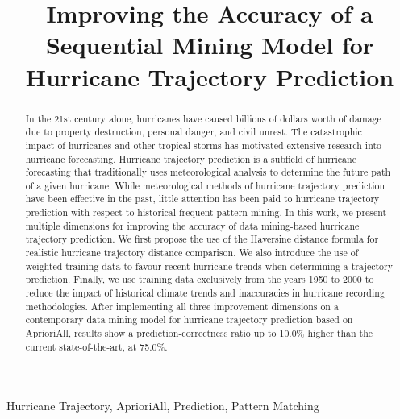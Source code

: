 \documentclass[12pt,conference]{IEEEtran}
\begin{document}
\raggedbottom

\title{Improving the Accuracy of a Sequential Mining Model for Hurricane Trajectory Prediction}

\author{
}

\maketitle

\begin{abstract}

In the 21st century alone, hurricanes have caused billions of dollars worth of damage due to property destruction, personal danger, and civil unrest. The catastrophic impact of hurricanes and other tropical storms has motivated extensive research into hurricane forecasting. Hurricane trajectory prediction is a subfield of hurricane forecasting that traditionally uses meteorological analysis to determine the future path of a given hurricane. While meteorological methods of hurricane trajectory prediction have been effective in the past, little attention has been paid to hurricane trajectory prediction with respect to historical frequent pattern mining. In this work, we present multiple dimensions for improving the accuracy of data mining-based hurricane trajectory prediction. We first propose the use of the Haversine distance formula for realistic hurricane trajectory distance comparison. We also introduce the use of weighted training data to favour recent hurricane trends when determining a trajectory prediction. Finally, we use training data exclusively from the years 1950 to 2000 to reduce the impact of historical climate trends and inaccuracies in hurricane recording methodologies. After implementing all three improvement dimensions on a contemporary data mining model for hurricane trajectory prediction based on AprioriAll, results show a prediction-correctness ratio up to 10.0\% higher than the current state-of-the-art, at 75.0\%.

\end{abstract}

\begin{IEEEkeywords}
Hurricane Trajectory, AprioriAll, Prediction, Pattern Matching
\end{IEEEkeywords}
\end{document}
